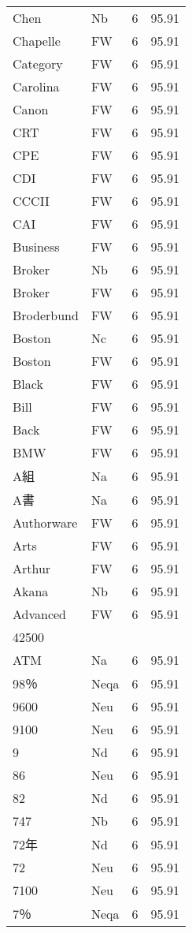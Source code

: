 \documentclass[twocolumn]{book}
\begin{document}
\begin{supertabular}{llrr}
Chen & Nb & 6 &  95.91\\
Chapelle & FW & 6 &  95.91\\
Category & FW & 6 &  95.91\\
Carolina & FW & 6 &  95.91\\
Canon & FW & 6 &  95.91\\
CRT & FW & 6 &  95.91\\
CPE & FW & 6 &  95.91\\
CDI & FW & 6 &  95.91\\
CCCII & FW & 6 &  95.91\\
CAI & FW & 6 &  95.91\\
Business & FW & 6 &  95.91\\
Broker & Nb & 6 &  95.91\\
Broker & FW & 6 &  95.91\\
Broderbund & FW & 6 &  95.91\\
Boston & Nc & 6 &  95.91\\
Boston & FW & 6 &  95.91\\
Black & FW & 6 &  95.91\\
Bill & FW & 6 &  95.91\\
Back & FW & 6 &  95.91\\
BMW & FW & 6 &  95.91\\
A組 & Na & 6 &  95.91\\
A書 & Na & 6 &  95.91\\
Authorware & FW & 6 &  95.91\\
Arts & FW & 6 &  95.91\\
Arthur & FW & 6 &  95.91\\
Akana & Nb & 6 &  95.91\\
Advanced & FW & 6 &  95.91\\
42500\\
ATM & Na & 6 &  95.91\\
98％ & Neqa & 6 &  95.91\\
9600 & Neu & 6 &  95.91\\
9100 & Neu & 6 &  95.91\\
9 & Nd & 6 &  95.91\\
86 & Neu & 6 &  95.91\\
82 & Nd & 6 &  95.91\\
747 & Nb & 6 &  95.91\\
72年 & Nd & 6 &  95.91\\
72 & Neu & 6 &  95.91\\
7100 & Neu & 6 &  95.91\\
7％ & Neqa & 6 &  95.91\\

\end{supertabular}
\end{document}
